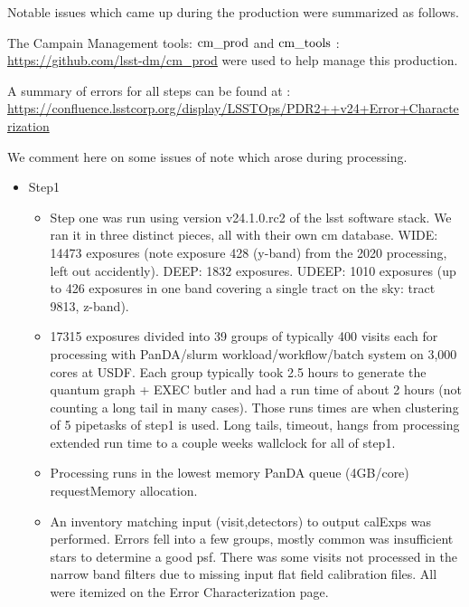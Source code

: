 Notable issues which came up during the production were summarized as follows.

The Campain Management tools: $\rm cm\_prod$ and $\rm cm\_tools$ : \url{https://github.com/lsst-dm/cm_prod} were used to help manage this production.  

A summary of errors for all steps can be found at : \url{https://confluence.lsstcorp.org/display/LSSTOps/PDR2++v24+Error+Characterization}

We comment here on some issues of note which arose during processing.

\begin{itemize}

\item Step1
\begin{itemize}

  \item
Step one was run using version v24.1.0.rc2 of the lsst software stack. We ran it in three distinct pieces, all with their own cm database.  WIDE: 14473 exposures (note exposure 428 (y-band) from the 2020 processing, left out accidently). DEEP: 1832 exposures. UDEEP: 1010 exposures (up to 426  exposures in one band covering a single tract on the sky: tract 9813, z-band).  

  \item
17315 exposures divided into 39 groups of typically 400 visits each for processing with PanDA/slurm workload/workflow/batch system on 3,000 cores at USDF.  Each group typically took 2.5 hours to generate the quantum graph + EXEC butler and had a run time of about 2 hours (not counting a long tail in many cases). Those
runs times are  when clustering of 5 pipetasks of step1 is used. Long tails, timeout, hangs from processing extended run time to a couple weeks wallclock for all of step1.

\item
Processing runs in the lowest memory PanDA queue (4GB/core) requestMemory allocation.

\item An inventory matching input (visit,detectors) to output calExps was performed.  Errors fell into a few groups, mostly common was insufficient stars
to determine a good psf.  There was some visits not processed 
in the narrow band filters due to missing input flat field
calibration files.  All were itemized on the Error Characterization page.

\end{itemize} %


\end{itemize}
